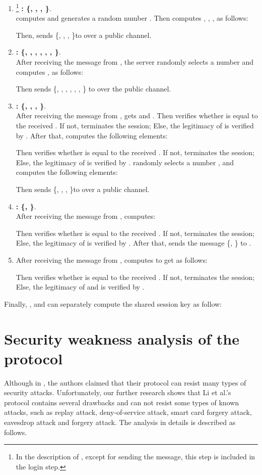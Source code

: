 \documentclass[preprint,12pt]{elsarticle}
\begin{document}
\begin{enumerate}[Step 1:]
\item\footnote{In the description of \cite{passwd-based-multi7}, except for sending the message, this step is included in the login step.} \textbf{  : \{, , , \}}.\\
 computes  and generates a random number . Then  computes  , , ,  as follows:

Then,  sends \{, , , \}to  over a public channel.
\item \textbf{  : \{, , , , , ,  \}}.\\
After receiving the message from , the server  randomly selects a number  and computes ,  as follows:

Then  sends \{, , , , , ,  \} to  over the public channel.
\item \textbf{  : \{, , ,  \}}.\\
After receiving the message from ,  gets  and . Then  verifies whether  is equal to the received . If not,  terminates the session; Else, the legitimacy of  is verified by . After that,  computes the following elements:

Then  verifies whether  is equal to the received . If not,  terminates the session; Else, the legitimacy of  is verified by .  randomly selects a number , and computes the following elements:

Then  sends \{, , ,  \}to  over a public channel.
\item \textbf{  : \{, \}}.\\
After receiving the message from ,  computes:

Then  verifies whether  is equal to the received . If not,  terminates the session; Else, the legitimacy of  is verified by . After that,  sends the message \{, \} to .
\item
After receiving the message from ,  computes to get  as follows:

Then  verifies whether  is equal to the received . If not,  terminates the session; Else, the legitimacy of  and  is verified by .
\end{enumerate}

 Finally, ,  and  can separately compute the shared session key  as follow:


\section{Security weakness analysis of the protocol}
Although in \cite{passwd-based-multi7}, the authors claimed that their protocol can resist many types of security attacks. Unfortunately, our further research shows that Li et al.'s protocol contains several drawbacks and can not resist some types of known attacks, such as replay attack, deny-of-service attack, smart card forgery attack, eavesdrop attack and forgery attack. The analysis in details is described as follows.
\end{document}
